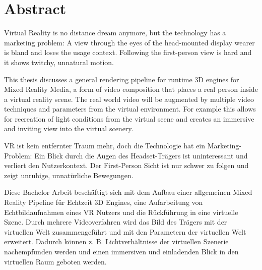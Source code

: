 %
\chapter*{Abstract}
\label{sec:abstract}
\vspace*{-10mm}

Virtual Reality is no distance dream anymore, but the technology has a 
marketing problem: A view through the eyes of the head-mounted display wearer 
is bland and loses the usage context. Following the first-person view is hard 
and it shows twitchy, unnatural motion.

This thesis discusses a general rendering pipeline for runtime 3D engines for 
Mixed Reality Media, a form of video composition that places a real person 
inside a virtual reality scene. The real world video will be augmented by 
multiple video techniques and parameters from the virtual environment.
\newline
For example this allows for recreation of light conditions from the virtual 
scene and creates an immersive and inviting view into the virtual scenery.

\begin{center}
	\hrulefill
\end{center}

VR ist kein entfernter Traum mehr, doch die Technologie hat ein 
Marketing-Problem: Ein Blick durch die Augen des Headset-Trägers ist 
uninteressant und verliert den Nutzerkontext. Der First-Person Sicht ist nur 
schwer zu folgen und zeigt unruhige, unnatürliche Bewegungen.

Diese Bachelor Arbeit beschäftigt sich mit dem Aufbau einer allgemeinen Mixed 
Reality Pipeline für Echtzeit 3D Engines, eine Aufarbeitung von 
Echtbildaufnahmen eines VR Nutzers und die Rückführung in eine virtuelle Szene. 
Durch mehrere Videoverfahren wird das Bild des Trägers mit der virtuellen Welt 
zusammengeführt und mit den Parametern der virtuellen Welt erweitert.
\newline
Dadurch können z. B. Lichtverhältnisse der virtuellen Szenerie nachempfunden 
werden und einen immersiven und einladenden Blick in den virtuellen Raum 
geboten werden.